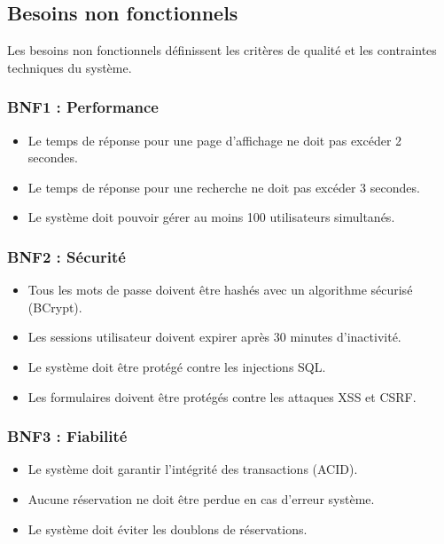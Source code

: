 \documentclass[12pt,a4paper]{report}
\begin{document}
\subsection{Besoins non fonctionnels}

Les besoins non fonctionnels définissent les critères de qualité et les contraintes techniques du système.

\subsubsection{BNF1 : Performance}

\begin{itemize}
    \item Le temps de réponse pour une page d'affichage ne doit pas excéder 2 secondes.
    \item Le temps de réponse pour une recherche ne doit pas excéder 3 secondes.
    \item Le système doit pouvoir gérer au moins 100 utilisateurs simultanés.
\end{itemize}

\subsubsection{BNF2 : Sécurité}

\begin{itemize}
    \item Tous les mots de passe doivent être hashés avec un algorithme sécurisé (BCrypt).
    \item Les sessions utilisateur doivent expirer après 30 minutes d'inactivité.
    \item Le système doit être protégé contre les injections SQL.
    \item Les formulaires doivent être protégés contre les attaques XSS et CSRF.
\end{itemize}

\subsubsection{BNF3 : Fiabilité}

\begin{itemize}
    \item Le système doit garantir l'intégrité des transactions (ACID).
    \item Aucune réservation ne doit être perdue en cas d'erreur système.
    \item Le système doit éviter les doublons de réservations.
\end{itemize}
\end{document}
